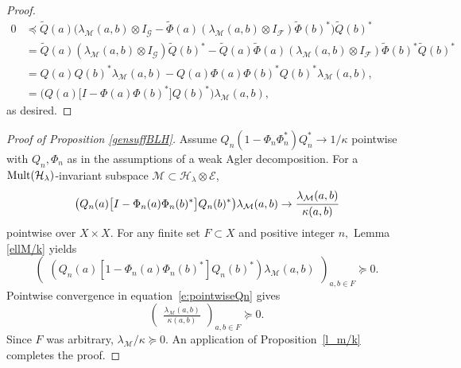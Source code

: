 \documentclass[a4paper,reqno,index]{amsart}
\numberwithin{equation}{section}
\newcommand{\cM}{\mathcal{M}}
\newcommand{\cH}{\mathcal{H}}
\newcommand{\HSE}{\mathcal{E}}
\newcommand{\genk}{\kappa} %
\newcommand{\genl}{\lambda} %
\theoremstyle{definition}
\begin{document}
\begin{proof}
\begin{align*}
0 &\preceq \widetilde{Q}(a)\big(\genl_{\mathcal{M}}(a,b)\otimes I_{\mathcal{G}}-\widetilde{\Phi}(a)(\genl_{\mathcal{M}}(a,b)\otimes I_{\mathcal{F}})\widetilde{\Phi}(b)^*\big)\widetilde{Q}(b)^*  \\ 
&= \widetilde{Q}(a)(\genl_{\mathcal{M}}(a,b)\otimes I_{\mathcal{G}})\widetilde{Q}(b)^*-\widetilde{Q}(a)\widetilde{\Phi}(a)(\genl_{\mathcal{M}}(a,b)\otimes I_{\mathcal{F}})\widetilde{\Phi}(b)^*\widetilde{Q}(b)^*  \\ 
&= Q(a)Q(b)^*\genl_{\mathcal{M}}(a,b)-Q(a)\Phi(a)\Phi(b)^*Q(b)^*\genl_{\mathcal{M}}(a,b),\\
&= \big(Q(a)\big[I-\Phi(a)\Phi(b)^*\big]Q(b)^*\big)\genl_{\mathcal{M}}(a,b),
\end{align*}
as desired.
\end{proof}


\begin{proof}[Proof of Proposition \ref{gensuffBLH}] 
Assume
$Q_n(1-\Phi_n\Phi_n^*)Q_n^*\to 1/\kappa$  pointwise with $Q_n, \Phi_n$ as in the assumptions of a weak Agler decomposition. For a 
$\textup{Mult}(\mathcal{H}_{\genl})$-invariant subspace  $\mathcal{M} \subset \cH_\genl \otimes \HSE$,
\begin{equation}
    \label{e:pointwiseQn}
   \big(Q_n(a)\big[I-\Phi_n(a)\Phi_n(b)^*\big]Q_n(b)^*\big)\genl_\cM(a, b)\to \cfrac{\genl_\cM(a, b)}{\genk(a, b)}
   \end{equation}
pointwise over $X\times X.$ For any finite set $F\subset X$ and positive integer $n,$   Lemma \ref{ellM/k} yields 
\[
  \begin{pmatrix} (Q_n(a)[1-\Phi_n(a)\Phi_n(b)^*]Q_n(b)^*)\lambda_\cM(a,b) \end{pmatrix}_{a,b\in F} \succeq0.
\]
Pointwise  convergence in equation~\eqref{e:pointwiseQn} gives 
\[
\begin{pmatrix} \frac{\lambda_\cM (a,b) }{\kappa (a,b) } \end{pmatrix}_{a,b\in F} \succeq0.
\]
Since $F$ was arbitrary, 
$\genl_{\mathcal{M}}/\genk\succeq 0.$  An application of
Proposition~\ref{l_m/k} completes the proof.
\end{proof}

 
\end{document}
